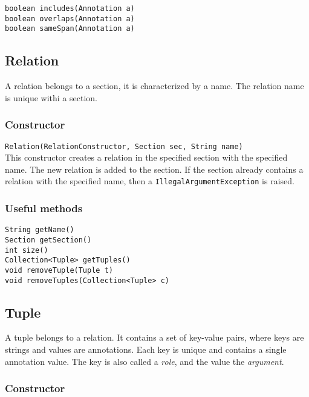 \documentclass[a4paper]{article}
\begin{document}
\texttt{boolean includes(Annotation a)}\\
\texttt{boolean overlaps(Annotation a)}\\
\texttt{boolean sameSpan(Annotation a)}\\

\subsection{Relation}
A relation belongs to a section, it is characterized by a name.
The relation name is unique withi a section.

\subsubsection{Constructor}

\texttt{Relation(RelationConstructor, Section sec, String name)}\\
This constructor creates a relation in the specified section with the specified name.
The new relation is added to the section.
If the section already contains a relation with the specified name, then a \texttt{IllegalArgumentException} is raised.

\subsubsection{Useful methods}

\texttt{String getName()}\\
\texttt{Section getSection()}\\
\texttt{int size()}\\

\texttt{Collection<Tuple> getTuples()}\\
\texttt{void removeTuple(Tuple t)}\\
\texttt{void removeTuples(Collection<Tuple> c)}\\

\subsection{Tuple}
A tuple belongs to a relation.
It contains a set of key-value pairs, where keys are strings and values are annotations.
Each key is unique and contains a single annotation value.
The key is also called a \emph{role}, and the value the \emph{argument}.

\subsubsection{Constructor}
\end{document}
